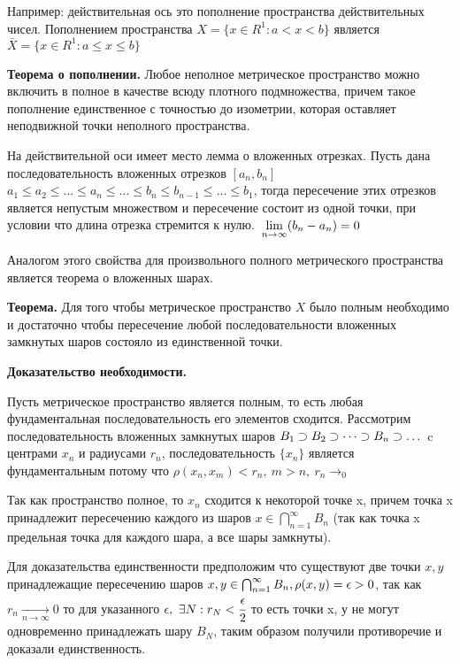 \documentclass[12pt]{report}
\renewcommand{\[}{$\\\displaystyle}
\renewcommand{\]}{\\$}
\renewcommand{\[}{$\\\displaystyle}
\newcommand{\sep}{,\ }
\newcommand{\tth}[1][]{\textbf{Теорема#1.}}
\begin{document}
Например: действительная ось это пополнение пространства действительных чисел.
Пополнением пространства $X = \{x \in R^1: a < x < b\}$ является
$\bar{X} = \{x \in R^1: a \leq x \leq b\}$

\tth[ о пополнении] Любое неполное метрическое пространство можно
включить в полное в качестве всюду плотного подмножества, причем такое
пополнение единственное с точностью до изометрии, которая оставляет неподвижной
точки неполного пространства.

На действительной оси имеет место лемма о вложенных отрезках. Пусть дана
последовательность вложенных отрезков $[a_n, b_n]$ $a_1 \leq a_2 \leq \dots \leq
a_n \leq \dots \leq b_n \leq b_{n-1} \leq \dots \leq b_1 $, тогда пересечение
этих отрезков является непустым множеством и пересечение состоит из одной
точки, при условии что длина отрезка стремится к нулю.
\[ \lim_{n \rightarrow \infty}(b_n - a_n) = 0\]

Аналогом этого свойства для произвольного полного метрического пространства
является теорема о вложенных шарах.

\tth[] Для того чтобы метрическое пространство $X$ было полным
необходимо и достаточно чтобы пересечение любой последовательности вложенных
замкнутых шаров состояло из единственной точки.

\textbf{Доказательство необходимости.}

Пусть метрическое пространство является полным, то есть любая фундаментальная
последовательность его элементов сходится. Рассмотрим последовательность
вложенных замкнутых шаров
\[ B_{1} \supset B_{2} \supset \dots \supset B_{n} \supset \dots\]
c центрами $x_{n}$ и радиусами $r_{n}$, последовательность $\{x_n\}$ является
фундаментальным потому что $\rho(x_n, x_m) < r_n\sep m > n\sep r_n\rightarrow_0$

Так как пространство полное, то $x_{n}$ сходится к некоторой точке x,
причем точка x принадлежит пересечению каждого из шаров $x \in \bigcap _{n = 1}^{\infty} B_{n}$ (так как точка x
предельная точка для каждого шара, а все шары замкнуты).

Для доказательства единственности предположим что существуют две точки $x, y$
принадлежащие пересечению шаров
$x, y \in \bigcap _{n = 1}^{\infty} B_{n}, \\ \rho(x, y) = \epsilon > 0$, так как
$r_n \xrightarrow[n \rightarrow \infty]{} 0$ то для указанного
$\epsilon \sep \exists N: r_N < \cfrac\epsilon2$
то есть точки x, у не могут одновременно принадлежать шару $B_N$, таким образом
получили противоречие и доказали единственность.
\end{document}
